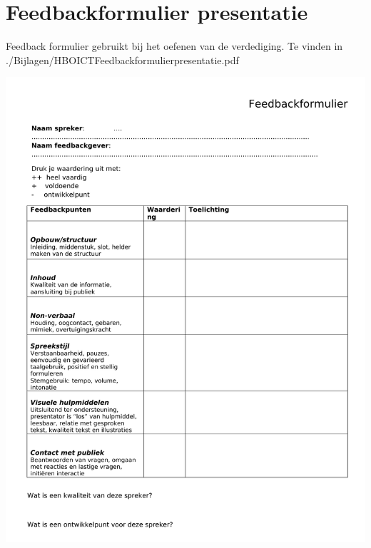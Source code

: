 \documentclass[a4paper, 11pt, oneside]{report}
\begin{document}
\chapter{Feedbackformulier presentatie}\label{sec:feedbackformulier-presentatie}
Feedback formulier gebruikt bij het oefenen van de verdediging.
Te vinden in ./Bijlagen/HBOICTFeedbackformulierpresentatie.pdf
\begin{center}\includegraphics[page=1,width=.8\linewidth]{Bijlagen/HBOICTFeedbackformulierpresentatie.pdf}\end{center}
\end{document}
